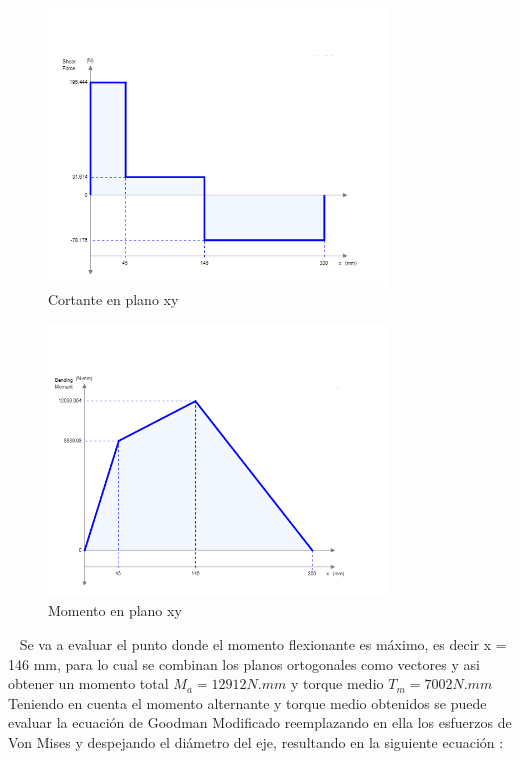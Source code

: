 \begin{figure}[ht!]
    \centering
    \includegraphics[height = 0.4\textheight,width=0.8\textwidth]{Cap5_DisenoDetallado/Figuras/Eje/Vxy.PNG}
    \caption{Cortante en plano xy}
    \label{fig:Vxy}
\end{figure}

\begin{figure}[ht!]
    \centering
    \includegraphics[height = 0.4\textheight,width=0.8\textwidth]{Cap5_DisenoDetallado/Figuras/Eje/Flectorxy.PNG}
    \caption{Momento en plano xy}
    \label{fig:Fxy}
\end{figure}
\newpage
~
\newpage
Se va a evaluar el punto donde el momento flexionante es máximo, es decir x = 146 mm, para lo cual se combinan los planos ortogonales como vectores y asi obtener un momento total $M_a = 12912 N.mm$ y torque medio $T_m = 7002 N.mm$
Teniendo en cuenta el momento alternante y torque medio obtenidos se puede evaluar la ecuación de Goodman Modificado reemplazando en ella los esfuerzos de Von Mises y despejando el diámetro del eje, resultando en la siguiente ecuación \citep{shigley2011shigley}:


